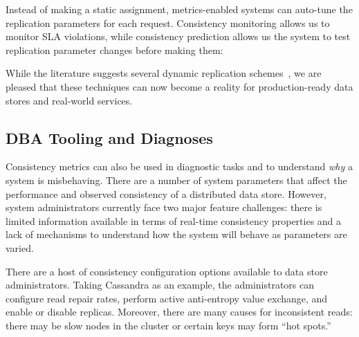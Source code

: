 
Instead of making a static assignment, metrics-enabled systems can
auto-tune the replication parameters for each request. Consistency
monitoring allows us to monitor SLA violations, while consistency
prediction allows us the system to test replication parameter changes
before making them:


While the literature suggests several dynamic replication
schemes~\cite{vahdat-article}, we are pleased that these techniques
can now become a reality for production-ready data stores and
real-world services.

\subsection{DBA Tooling and Diagnoses}
\label{sec:dba}

Consistency metrics can also be used in diagnostic tasks and to
understand \textit{why} a system is misbehaving. There are a number of
system parameters that affect the performance and observed
consistency of a distributed data store. However, system
administrators currently face two major feature challenges: there is
limited information available in terms of real-time consistency
properties and a lack of mechanisms to understand how the system will
behave as parameters are varied.


There are a host of consistency configuration options available to
data store administrators. Taking Cassandra as an example, the
administrators can configure read repair rates, perform active
anti-entropy value exchange, and enable or disable replicas. Moreover,
there are many causes for inconsistent reads: there may be slow nodes
in the cluster or certain keys may form ``hot spots.''

